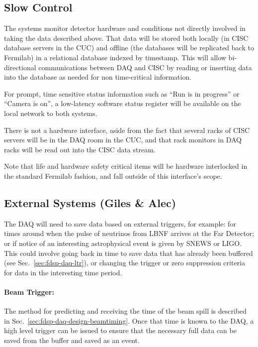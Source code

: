 \subsection{Slow Control}
\label{sec:fdsp-daq-intfc-sc}
\label{sec:fdgen-daq-intfc-sc}

The  systems monitor detector
hardware and conditions not directly involved in taking the data
described above.  That data will be stored both locally (in CISC
database servers in the CUC) and offline (the databases will be
replicated back to Fermilab) in a relational database indexed by
timestamp.  This will allow bi-directional communications between DAQ
and CISC by reading or inserting data into the database as needed for
non time-critical information.  

For prompt, time sensitive status information such as ``Run is in
progress'' or ``Camera is on'', a low-latency software status register
will be available on the local network to both systems.

There is not a hardware interface, aside from the fact that several
racks of CISC servers will be in the DAQ room in the CUC, and that rack
monitors in DAQ racks will be read out into the CISC data stream.

Note that life and hardware safety critical items will be hardware
interlocked in the standard Fermilab fashion, and fall outside of this
interface's scope.


\subsection{External Systems (Giles \& Alec)}
\label{sec:fdsp-daq-intfc-ext}


The DAQ will need to save data based on external triggers, for example:
for times around when the pulse of neutrinos from LBNF arrives at the
Far Detector; or if notice of an interesting astrophysical event is
given by SNEWS\cite{snews} or LIGO.  This could involve going back in
time to save data that has already been buffered (see
Sec.~\ref{sec:fdsp-daq-ltr}), or changing the trigger or zero
suppression criteria for data in the interesting time period.


\paragraph{Beam Trigger:} The method for predicting and receiving the
time of the beam spill is described in
Sec.~\ref{sec:fdsp-daq-design-beamtiming}.  Once that time is known to
the DAQ, a high level trigger can be issued to ensure that the necessary
full data can be saved from the buffer and saved as an event.

